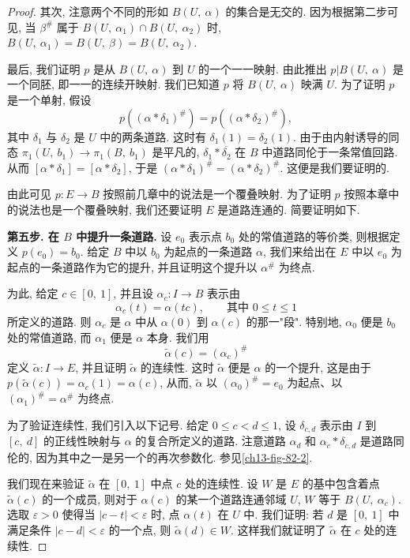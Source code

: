 \begin{proof}
其次, 注意两个不同的形如 $B(U,\ \alpha)$ 的集合是无交的. 因为根据第二步可见, 当 $\beta^{\#}$ 属于 $B(U,\ \alpha_{1})\cap B(U,\ \alpha_{2})$ 时, $B(U,\ \alpha_{1})=B(U,\ \beta)=B(U,\ \alpha_{2})$.

最后, 我们证明 $p$ 是从 $B(U,\ \alpha)$ 到 $U$ 的一个一一映射. 由此推出 $p|B(U,\ \alpha)$ 是一个同胚, 即一一的连续开映射. 我们已知道 $p$ 将 $B(U,\ \alpha)$ 映满 $U$. 为了证明 $p$ 是一个单射, 假设
\[
p((\alpha*\delta_{1})^{\#})=p((\alpha*\delta_{2})^{\#}),
\]
其中 $\delta_{1}$ 与 $\delta_{2}$ 是 $U$ 中的两条道路. 这时有 $\delta_{1}(1)=\delta_{2}(1)$. 由于由内射诱导的同态 $\pi_{1}(U,\ b_{1})\to\pi_{1}(B,\ b_{1})$ 是平凡的, $\delta_{1}*\overline{\delta_{2}}$ 在 $B$ 中道路同伦于一条常值回路. 从而 $[\alpha*\delta_{1}]=[\alpha*\delta_{2}]$, 于是 $(\alpha*\delta_{1})^{\#}=(\alpha*\delta_{2})^{\#}$. 这便是我们要证明的.

由此可见 $p\colon E\to B$ 按照前几章中的说法是一个覆叠映射. 为了证明 $p$ 按照本章中的说法也是一个覆叠映射, 我们还要证明 $E$ 是道路连通的. 简要证明如下.

\textbf{第五步. 在 $B$ 中提升一条道路.} 设 $e_{0}$ 表示点 $b_{0}$ 处的常值道路的等价类, 则根据定义 $p(e_{0})=b_{0}$. 给定 $B$ 中以 $b_{0}$ 为起点的一条道路 $\alpha$, 我们来给出在 $E$ 中以 $e_{0}$ 为起点的一条道路作为它的提升, 并且证明这个提升以 $\alpha^{\#}$ 为终点.

为此, 给定 $c\in[0,\ 1]$, 并且设 $\alpha_{c}\colon I\to B$ 表示由
\[
\alpha_{c}(t)=\alpha(tc),\qquad\text{其中 }0\leq t\leq 1
\]
所定义的道路. 则 $\alpha_{c}$ 是 $\alpha$ 中从 $\alpha(0)$ 到 $\alpha(c)$ 的那一"段". 特别地, $\alpha_{0}$ 便是 $b_{0}$ 处的常值道路, 而 $\alpha_{1}$ 便是 $\alpha$ 本身. 我们用
\[
\widetilde{\alpha}(c)=(\alpha_{c})^{\#}
\]
定义 $\widetilde{\alpha}\colon I\to E$, 并且证明 $\widetilde{\alpha}$ 的连续性. 这时 $\widetilde{\alpha}$ 便是 $\alpha$ 的一个提升, 这是由于 $p(\widetilde{\alpha}(c))=\alpha_{c}(1)=\alpha(c)$, 从而, $\widetilde{\alpha}$ 以 $(\alpha_{0})^{\#}=e_{0}$ 为起点、以 $(\alpha_{1})^{\#}=\alpha^{\#}$ 为终点.

为了验证连续性, 我们引入以下记号. 给定 $0\leq c<d\leq 1$, 设 $\delta_{c,d}$ 表示由 $I$ 到 $[c,\ d]$ 的正线性映射与 $\alpha$ 的复合所定义的道路. 注意道路 $\alpha_{d}$ 和 $\alpha_{c}*\delta_{c,d}$ 是道路同伦的, 因为其中之一是另一个的再次参数化. 参见\cref{ch13-fig-82-2}.


我们现在来验证 $\widetilde{\alpha}$ 在 $[0,\ 1]$ 中点 $c$ 处的连续性. 设 $W$ 是 $E$ 的基中包含着点 $\widetilde{\alpha}(c)$ 的一个成员, 则对于 $\alpha(c)$ 的某一个道路连通邻域 $U$, $W$ 等于 $B(U,\ \alpha_{c})$. 选取 $\varepsilon>0$ 使得当 $|c-t|<\varepsilon$ 时, 点 $\alpha(t)$ 在 $U$ 中. 我们证明: 若 $d$ 是 $[0,\ 1]$ 中满足条件 $|c-d|<\varepsilon$ 的一个点, 则 $\widetilde{\alpha}(d)\in W$. 这样我们就证明了 $\widetilde{\alpha}$ 在 $c$ 处的连续性.


\end{proof}
